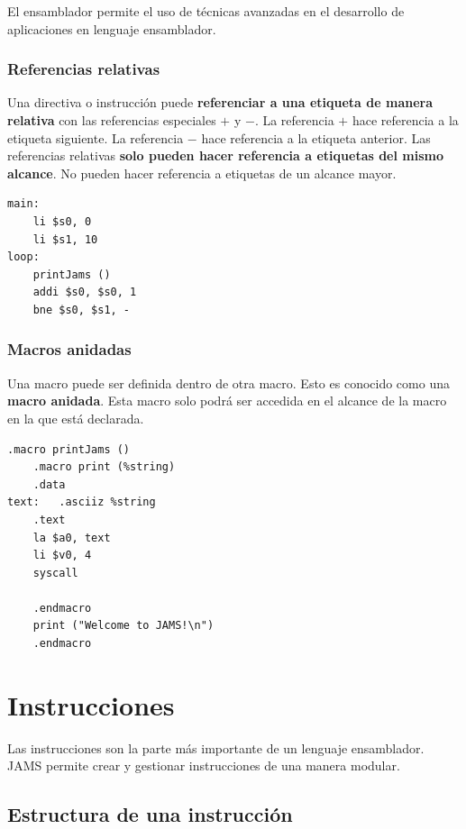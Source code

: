 El ensamblador permite el uso de técnicas avanzadas en
el desarrollo de aplicaciones en lenguaje ensamblador.

\subsubsection{Referencias relativas}\label{subsubsec:referencias-relativas}

Una directiva o instrucción puede \textbf{referenciar a una etiqueta de manera
relativa} con las referencias especiales $+$ y $-$.
La referencia $+$ hace referencia a la etiqueta siguiente.
La referencia $-$ hace referencia a la etiqueta anterior.
Las referencias relativas \textbf{solo pueden hacer referencia
a etiquetas del mismo alcance}.
No pueden hacer referencia a etiquetas de un alcance mayor.

\begin{lstlisting}[frame=single,label={lst:relative-reference}]
main:
    li $s0, 0
    li $s1, 10
loop:
    printJams ()
    addi $s0, $s0, 1
    bne $s0, $s1, -
\end{lstlisting}

\subsubsection{Macros anidadas}\label{subsubsec:macros-anidadas}

Una macro puede ser definida dentro de otra macro.
Esto es conocido como una \textbf{macro anidada}.
Esta macro solo podrá ser accedida en el alcance de la macro
en la que está declarada.

\begin{lstlisting}[frame=single,label={lst:nested-macro}]
    .macro printJams ()
    .macro print (%string)
    .data
text:   .asciiz %string
    .text
    la $a0, text
    li $v0, 4
    syscall

    .endmacro
    print ("Welcome to JAMS!\n")
    .endmacro
\end{lstlisting}


\section{Instrucciones}\label{sec:instrucciones}

Las instrucciones son la parte más importante de un lenguaje ensamblador.
JAMS permite crear y gestionar instrucciones de una manera modular.

\subsection{Estructura de una instrucción}\label{subsec:estructura-de-una-instruccion}

